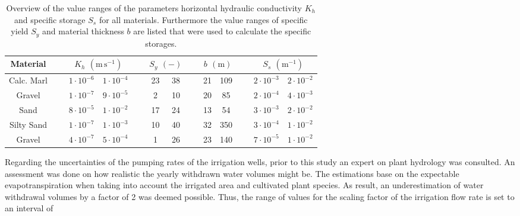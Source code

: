 \begin{table}[h]
    \label{Tab-MatPropsRange}
    \caption{Overview of the value ranges of the parameters horizontal hydraulic conductivity $K_h$ and specific storage $S_s$ for all materials. Furthermore the value ranges of specific yield $S_y$ and material thickness $b$ are listed that were used to calculate the specific storages.}
    \begin{tabular}{clcclcclcclcc}
        Material   & $\; \;$ & \multicolumn{2}{c}{$K_h$ $(\textrm{m} \, \textrm{s}^{-1})$} & $\; \;$ & \multicolumn{2}{c}{$S_y$ $(-)$} & $\; \;$ & \multicolumn{2}{c}{$b$ $(\textrm{m})$} & $\; \;$ & \multicolumn{2}{c}{$S_s$ $(\textrm{m}^{-1})$} \\ \hline
        Calc. Marl &         & $1 \cdot 10^{-6}$            & $1 \cdot 10^{-4}$            &         & 23             & 38             &         & 21                & 109                &         & $2 \cdot 10^{-3}$     & $2 \cdot 10^{-2}$     \\
        Gravel     &         & $1 \cdot 10^{-7}$            & $9 \cdot 10^{-5}$            &         & 2              & 10             &         & 20                & 85                 &         & $2 \cdot 10^{-4}$     & $4 \cdot 10^{-3}$     \\
        Sand       &         & $8 \cdot 10^{-5}$            & $1 \cdot 10^{-2}$            &         & 17             & 24             &         & 13                & 54                 &         & $3 \cdot 10^{-3}$     & $2 \cdot 10^{-2}$     \\
        Silty Sand &         & $1 \cdot 10^{-7}$            & $1 \cdot 10^{-3}$            &         & 10             & 40             &         & 32                & 350                &         & $3 \cdot 10^{-4}$     & $1 \cdot 10^{-2}$     \\
        Gravel     &         & $4 \cdot 10^{-7}$            & $5 \cdot 10^{-4}$            &         & 1              & 26             &         & 23                & 140                &         & $7 \cdot 10^{-5}$     & $1 \cdot 10^{-2}$    
    \end{tabular}
\end{table}

Regarding the uncertainties of the pumping rates of the irrigation wells, prior to this study an expert on plant hydrology was consulted. 
An assessment was done on how realistic the yearly withdrawn water volumes might be. 
The estimations base on the expectable evapotranspiration when taking into account the irrigated area and cultivated plant species. 
As result, an underestimation of water withdrawal volumes by a factor of 2 was deemed possible. 
Thus, the range of values for the scaling factor of the irrigation flow rate is set to an interval of 

